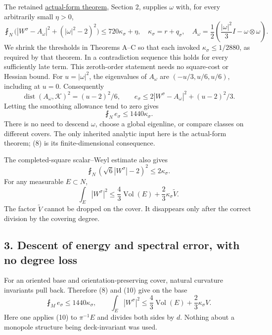 \documentclass[
  11pt,
]{article}
\begin{document}
The retained
\href{../mathematics/current/line1_composed_application.md}{actual-form
theorem}, Section 2, supplies \(\omega\) with, for every arbitrarily
small \(\eta>0\), \[
 \fint_N\bigl(|W^\sigma-A_\omega|^2+(|\omega|^2-2)^2\bigr)
       \le720\kappa_\sigma+\eta,
 \quad \kappa_\sigma=r+q_\sigma,
 \quad A_\omega=\frac12\left(\frac{|\omega|^2}{3}I-\omega\otimes\omega\right).
 \tag{7}
\] We shrink the thresholds in Theorems A--C so that each invoked
\(\kappa_\sigma\le1/2880\), as required by that theorem. In a
contradiction sequence this holds for every sufficiently late term. This
zeroth-order statement needs no square-cost or Hessian bound. For
\(u=|\omega|^2\), the eigenvalues of \(A_\omega\) are
\((-u/3,u/6,u/6)\), including at \(u=0\). Consequently \[
 \operatorname{dist}(A_\omega,\mathcal K)^2=(u-2)^2/6,
 \qquad e_\sigma\le2|W^\sigma-A_\omega|^2+(u-2)^2/3.
\] Letting the smoothing allowance tend to zero gives \[
                         \fint_N e_\sigma\le1440\kappa_\sigma.
 \tag{8}
\] There is no need to descend \(\omega\), choose a global eigenline, or
compare classes on different covers. The only inherited analytic input
here is the actual-form theorem; (8) is its finite-dimensional
consequence.

The completed-square scalar--Weyl estimate also gives \[
 \fint_N(\sqrt6|W^\sigma|-2)^2\le2\kappa_\sigma.
 \tag{9}
\] For any measurable \(E\subset N\), \[
 \int_E|W^\sigma|^2\le\frac43\operatorname{Vol}(E)
                                      +\frac23\kappa_\sigma\widetilde V.
 \tag{10}
\] The factor \(\widetilde V\) cannot be dropped on the cover. It
disappears only after the correct division by the covering degree.

\hypertarget{descent-of-energy-and-spectral-error-with-no-degree-loss}{%
\subsection{3. Descent of energy and spectral error, with no degree
loss}\label{descent-of-energy-and-spectral-error-with-no-degree-loss}}

For an oriented base and orientation-preserving cover, natural curvature
invariants pull back. Therefore (8) and (10) give on the base \[
 \fint_M e_\sigma\le1440\kappa_\sigma,\qquad
 \int_E|W^\sigma|^2\le\frac43\operatorname{Vol}(E)
                                      +\frac23\kappa_\sigma V.
 \tag{11}
\] Here one applies (10) to \(\pi^{-1}E\) and divides both sides by
\(d\). Nothing about a monopole structure being deck-invariant was used.
\end{document}

